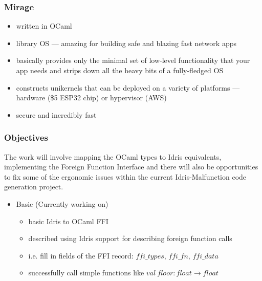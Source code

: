 \documentclass{beamer}
\begin{document}
\begin{frame}
	\frametitle{Mirage}

	\begin{itemize}
		\item written in OCaml
		      \pause
		\item library OS --- amazing for building safe and
		      blazing fast network apps
		      \pause
		\item basically provides only the minimal set of low-level
		      functionality that your app needs and strips down all the
		      heavy bits of a fully-fledged OS
		      \pause
		\item constructs unikernels that can be deployed on
		      a variety of platforms --- hardware (\$5 ESP32 chip)
		      or hypervisor (AWS)
		      \pause
		\item secure and incredibly fast
	\end{itemize}
\end{frame}


\begin{frame}
	\frametitle{Objectives}

	The work will involve mapping the OCaml types to Idris equivalents,
	implementing the Foreign Function Interface and there will also be
	opportunities to fix some of the ergonomic issues within the
	current Idris-Malfunction code generation project.

	\pause
	\begin{itemize}
		\item Basic	(Currently working on)
		      \pause
		      \begin{itemize}
			      \item basic Idris to OCaml FFI
			            \pause
			      \item described using Idris support for describing
			            foreign function calls
			            \pause
			      \item i.e. fill in fields of the FFI record:
			            $ffi\_types$, $ffi\_fn$, $ffi\_data$
			            \pause
			      \item successfully call simple functions like
			            $val \ floor : float \rightarrow float$
		      \end{itemize}
	\end{itemize}
\end{frame}
\end{document}
